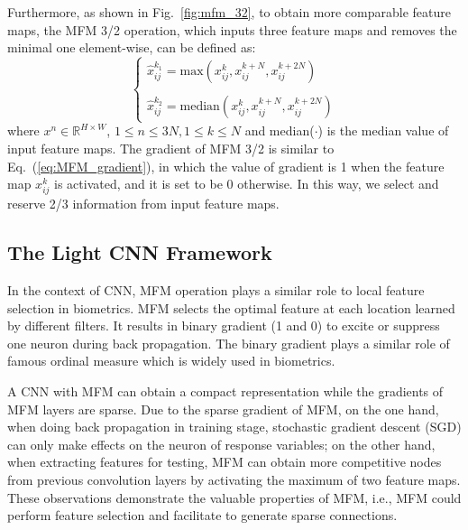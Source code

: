 \documentclass[journal,transmag]{IEEEtran}
\begin{document}
Furthermore, as shown in Fig.~\ref{fig:mfm_32}, to obtain more comparable feature maps, the MFM 3/2 operation, which inputs three feature maps and removes the minimal one element-wise, can be defined as:
\begin{equation}
\left\{
\begin{array}{l}
\hat{x}^{k_1}_{ij}=\text{max}(x^{k}_{ij}, x^{k+N}_{ij}, x^{k+2N}_{ij}) \\
\\
\hat{x}^{k_2}_{ij}=\text{median}(x^{k}_{ij}, x^{k+N}_{ij}, x^{k+2N}_{ij})
\end{array}
\right.
\label{eq:MFM_32}
\end{equation}
where $x^n \in \mathbb{R}^{H\times W}$,  $1 \leq n \leq 3N, 1 \leq k \leq N$ and median($\cdot$) is the median value of input feature maps. The gradient of MFM 3/2 is similar to Eq.~(\ref{eq:MFM_gradient}), in which the value of gradient is 1 when the feature map $x^{k}_{ij}$ is activated, and it is set to be 0 otherwise. In this way, we select and reserve 2/3 information from input feature maps.

\subsection{The Light CNN Framework}
In the context of CNN, MFM operation plays a similar role to local feature selection in biometrics.
MFM selects the optimal feature at each location learned by different filters. It results in binary gradient (1 and 0) to excite or suppress one neuron during back propagation. The binary gradient plays a similar role of famous ordinal measure \cite{DBLP:journals/pami/SunT09} which is widely used in biometrics.

A CNN with MFM can obtain a compact representation while the gradients of MFM layers are sparse. Due to the sparse gradient of MFM, on the one hand, when doing back propagation in training stage, stochastic gradient descent (SGD) can only make effects on the neuron of response variables; on the other hand, when extracting features for testing, MFM can obtain more competitive nodes from previous convolution layers by activating the maximum of two feature maps. These observations demonstrate the valuable properties of MFM, i.e., MFM could perform feature selection and facilitate to generate sparse connections.
\end{document}
